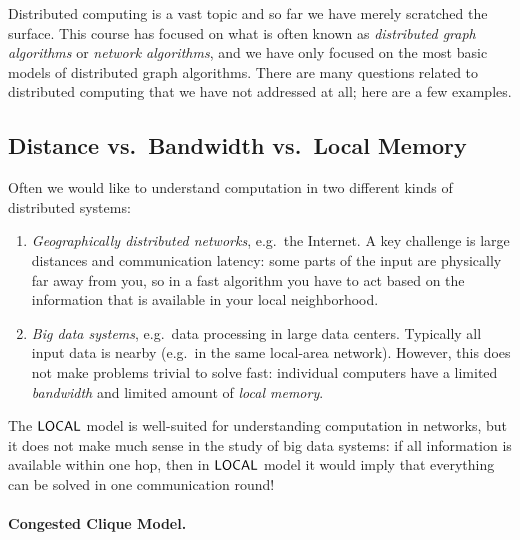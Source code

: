 Distributed computing is a vast topic and so far we have merely scratched the surface. This course has focused on what is often known as \emph{distributed graph algorithms} or \emph{network algorithms}, and we have only focused on the most basic models of distributed graph algorithms. There are many questions related to distributed computing that we have not addressed at all; here are a few examples.

\subsection{Distance vs.\ Bandwidth vs.\ Local Memory}

Often we would like to understand computation in two different kinds of distributed systems:
\begin{enumerate}
  \item \emph{Geographically distributed networks}, e.g.\ the Internet. A key challenge is large distances and communication latency: some parts of the input are physically far away from you, so in a fast algorithm you have to act based on the information that is available in your local neighborhood.
  \item \emph{Big data systems}, e.g.\ data processing in large data centers. Typically all input data is nearby (e.g.\ in the same local-area network). However, this does not make problems trivial to solve fast: individual computers have a limited \emph{bandwidth} and limited amount of \emph{local memory}.
\end{enumerate}
The $\textup{\sffamily LOCAL}$ model is well-suited for understanding computation in networks, but it does not make much sense in the study of big data systems: if all information is available within one hop, then in $\textup{\sffamily LOCAL}$ model it would imply that everything can be solved in one communication round!

\paragraph{Congested Clique Model.}

